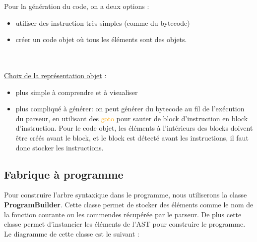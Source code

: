 \documentclass[a4paper]{article}%
\begin{document}
Pour la génération du code, on a deux options :
\begin{itemize}
  \item utiliser des instruction très simples (comme du \gls{bytecode})
\item créer un code objet où tous les éléments sont des objets.
\end{itemize}\leavevmode\\~\\

\underline{Choix de la représentation objet} :
\begin{itemize}
\item plus simple à comprendre et à visualiser
\item plus compliqué à générer: on peut générer du bytecode au fil de l'exécution du parseur, en utilisant des \textcolor{orange}{goto} pour sauter de block d'instruction en block d'instruction. Pour le code objet, les éléments à l'intérieurs des blocks doivent être créés avant le block, et le block est détecté avant les instructions, il faut donc stocker les instructions.
\end{itemize}


\clearpage{}

\subsection{Fabrique à programme}

Pour construire l'arbre syntaxique dans le programme, nous utiliserons
la classe \textbf{ProgramBuilder}. Cette classe permet de stocker des éléments
comme le nom de la fonction courante ou les commendes récupérée par le parseur.
De plus cette classe permet d'instancier les éléments de l'AST pour construire
le programme. Le diagramme de cette classe est le suivant :
\end{document}
